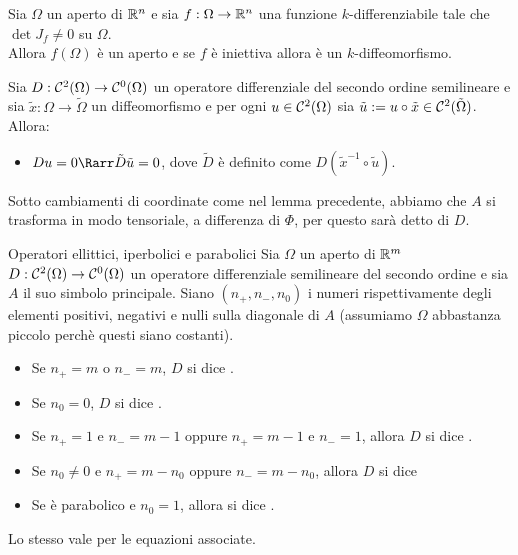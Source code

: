 \documentclass{book}
\begin{document}
\begin{corollary}{}{}
    Sia $\Omega$ un aperto di $\mathbb{R}^n$ e sia $f:\Omega\to\mathbb{R}^n$ una funzione $k$-differenziabile tale che $\det J_f \neq 0$ su $\Omega$.\\
    Allora $f(\Omega)$ è un aperto e se $f$ è iniettiva allora è un $k$-diffeomorfismo.
\end{corollary}

\begin{lemma}{}{}
    Sia $D:\mathcal{C}^2(\Omega)\to\mathcal{C}^0(\Omega)$ un operatore differenziale del secondo ordine semilineare e sia $\tilde{x} : \Omega \to \tilde{\Omega}$ un diffeomorfismo e per ogni $u \in \mathcal{C}^2(\Omega)$ sia $\tilde{u} := u\circ \tilde{x} \in \mathcal{C}^2(\tilde{\Omega})$. Allora:\begin{itemize}
        \item $Du = 0 \Rarr \tilde{D}\tilde{u} = 0$, dove $\tilde{D}$ è definito come $D(\tilde{x}^{-1}\circ \tilde{u})$.
    \end{itemize}
\end{lemma}

\begin{remark}{}{}
    Sotto cambiamenti di coordinate come nel lemma precedente, abbiamo che $A$ si trasforma in modo tensoriale, a differenza di $\Phi$, per questo sarà detto  di $D$.
\end{remark}

\begin{definition}{Operatori ellittici, iperbolici e parabolici}{}
    Sia $\Omega$ un aperto di $\mathbb{R}^m$ $D:\mathcal{C}^2(\Omega)\to\mathcal{C}^0(\Omega)$ un operatore differenziale semilineare del secondo ordine e sia $A$ il suo simbolo principale. Siano $(n_+,n_-,n_0)$ i numeri rispettivamente degli elementi positivi, negativi e nulli sulla diagonale di $A$ (assumiamo $\Omega$ abbastanza piccolo perchè questi siano costanti).\begin{itemize}
        \item Se $n_+ = m$ o $n_- = m$, $D$ si dice .
        \item Se $n_0=0$, $D$ si dice .
        \item Se $n_+ = 1$ e $n_- = m-1$ oppure $n_+ = m-1$ e $n_- = 1$, allora $D$ si dice .
        \item Se $n_0 \neq 0$ e $n_+ = m-n_0$ oppure $n_- = m-n_0$, allora $D$ si dice 
        \item Se è parabolico e $n_0 = 1$, allora si dice .
    \end{itemize}
    Lo stesso vale per le equazioni associate.
\end{definition}
\end{document}
